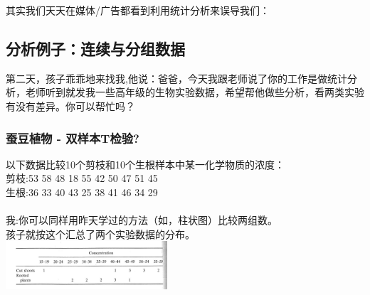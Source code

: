 其实我们天天在媒体/广告都看到利用统计分析来误导我们：



\hypertarget{ux5982ux4f55ux753bux830eux53f6ux56festem-and-leaf-plot}{%
\subsection{分析例子：连续与分组数据}\label{ux5982ux4f55ux753bux830eux53f6ux56festem-and-leaf-plot}}

第二天，孩子乖乖地来找我,他说：爸爸，今天我跟老师说了你的工作是做统计分析，老师听到就发我一些高年级的生物实验数据，希望帮他做些分析，看两类实验有没有差异。你可以帮忙吗？\\

\hypertarget{ux8695ux8c46ux690dux7269---ux53ccux6837ux672ctux68c0ux9a8c}{%
\subsubsection{蚕豆植物 -
双样本T检验?}\label{ux8695ux8c46ux690dux7269---ux53ccux6837ux672ctux68c0ux9a8c}}

以下数据比较10个剪枝和10个生根样本中某一化学物质的浓度：\\
剪枝:53 58 48 18 55 42 50 47 51 45\\
生根:36 33 40 43 25 38 41 46 34 29\\
~\\
我:你可以同样用昨天学过的方法（如，柱状图）比较两组数。\\
孩子就按这个汇总了两个实验数据的分布。\\

\includegraphics[width=6cm]{图片61-1.png}

